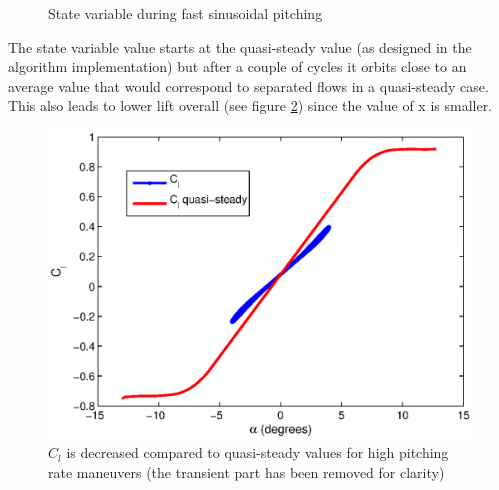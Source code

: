 \begin{figure}[h]
  \centering
  \caption{State variable during fast sinusoidal pitching}
  \label{fig:x_fast_pitching}
\end{figure}
\FloatBarrier

\par The state variable value starts at the quasi-steady value (as designed in the algorithm implementation) but after a couple of cycles it orbits close to an average value that would correspond to separated flows in a quasi-steady case.
This also leads to lower lift overall (see figure \ref{fig:Cl_fast_pitching}) since the value of x is smaller.

\begin{figure}[h]
  \centering
  \includegraphics{./Figures/Cl_vs_alpha_amp=4_k=0p5.eps}
  \caption{$C_l$ is decreased compared to quasi-steady values for high pitching rate maneuvers (the transient part has been removed for clarity)}
  \label{fig:Cl_fast_pitching}
\end{figure}

